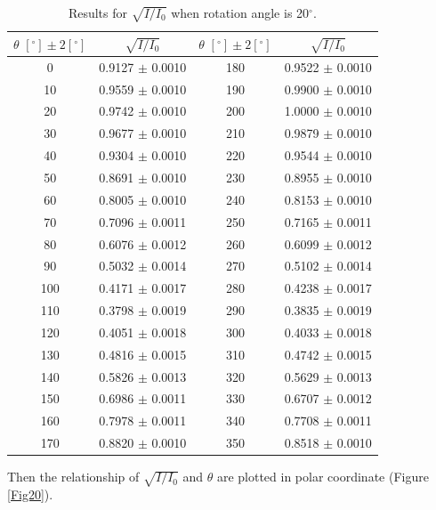 \documentclass{article}
\begin{document}
\begin{table}[H]\centering
\begin{tabular}{cc||cc}
\toprule
$\theta\,\,[^\circ] \pm 2[^\circ]$ & $\sqrt{I/I_0}$ & $\theta\,\,[^\circ] \pm 2[^\circ]$ & $\sqrt{I/I_0}$\\
\midrule
    0     & 0.9127   $\pm$ 0.0010  & 180   & 0.9522  $\pm$ 0.0010  \\
    10    & 0.9559   $\pm$ 0.0010  & 190   & 0.9900  $\pm$ 0.0010  \\
    20    & 0.9742   $\pm$ 0.0010  & 200   & 1.0000  $\pm$ 0.0010  \\
    30    & 0.9677   $\pm$ 0.0010  & 210   & 0.9879  $\pm$ 0.0010  \\
    40    & 0.9304   $\pm$ 0.0010  & 220   & 0.9544  $\pm$ 0.0010  \\
    50    & 0.8691   $\pm$ 0.0010  & 230   & 0.8955  $\pm$ 0.0010  \\
    60    & 0.8005   $\pm$ 0.0010  & 240   & 0.8153  $\pm$ 0.0010  \\
    70    & 0.7096   $\pm$ 0.0011  & 250   & 0.7165  $\pm$ 0.0011  \\
    80    & 0.6076   $\pm$ 0.0012  & 260   & 0.6099  $\pm$ 0.0012  \\
    90    & 0.5032   $\pm$ 0.0014  & 270   & 0.5102  $\pm$ 0.0014  \\
    100   & 0.4171   $\pm$ 0.0017  & 280   & 0.4238  $\pm$ 0.0017  \\
    110   & 0.3798   $\pm$ 0.0019  & 290   & 0.3835  $\pm$ 0.0019  \\
    120   & 0.4051   $\pm$ 0.0018  & 300   & 0.4033  $\pm$ 0.0018  \\
    130   & 0.4816   $\pm$ 0.0015  & 310   & 0.4742  $\pm$ 0.0015  \\
    140   & 0.5826   $\pm$ 0.0013  & 320   & 0.5629  $\pm$ 0.0013  \\
    150   & 0.6986   $\pm$ 0.0011  & 330   & 0.6707  $\pm$ 0.0012  \\
    160   & 0.7978   $\pm$ 0.0011  & 340   & 0.7708  $\pm$ 0.0011  \\
    170   & 0.8820   $\pm$ 0.0010  & 350   & 0.8518  $\pm$ 0.0010  \\
\bottomrule
\end{tabular}
\caption{Results for $\sqrt{I/I_0}$ when rotation angle is 20$^\circ$.}\label{TableSqrt20}
\end{table}

Then the relationship of $\sqrt{I/I_0}$ and $\theta$ are plotted in polar coordinate (Figure \ref{Fig20}).
\end{document}
